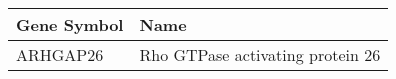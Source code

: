 \begin{tabular}{ll}
\toprule
Gene Symbol &                             Name \\
\midrule
   ARHGAP26 & Rho GTPase activating protein 26 \\
\bottomrule
\end{tabular}
